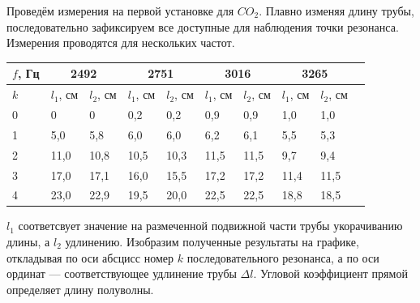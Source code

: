 \documentclass[a4paper, 12pt]{article} %
\begin{document}
        Проведём измерения на первой установке для $CO_2$.
        Плавно изменяя длину трубы, последовательно зафиксируем все доступные для наблюдения точки резонанса. Измерения проводятся для нескольких частот.
        \begin{center}
        \begin{tabular}{|l|l|l|l|l|l|l|l|l|l|}
            \hline
            $f$, Гц & \multicolumn{2}{|c|}{2492} & \multicolumn{2}{|c|}{2751}&  \multicolumn{2}{|c|}{3016} & \multicolumn{2}{|c|}{3265}
            \\
            \hline
            $k$ &  $l_1$, см& $l_2$, см & $l_1$, см & $l_2$, см & $l_1$, см & $l_2$, см & $l_1$, см & $l_2$, см
            \\
            
            \hline
            0 & 0 & 0 & 0,2 & 0,2 & 0,9 & 0,9 & 1,0 & 1,0
            \\
            \hline
            1 & 5,0 & 5,8 & 6,0 & 6,0 & 6,2 &  6,1 & 5,5 & 5,3
            \\
            \hline
            2 & 11,0 & 10,8 & 10,5 & 10,3 & 11,5 & 11,5 & 9,7 & 9,4
            \\
            \hline
            3 & 17,0 & 17,1 & 16,0 & 15,5 & 17,2 & 17,2 & 11,4 & 11,5
            \\
            \hline
            4 & 23,0 & 22,9 & 19,5 & 20,0 & 22,5 & 22,5 & 18,8 & 18,5
            \\
            \hline
        \end{tabular}
        \end{center}
        $l_1$ соответсвует значение на размеченной подвижной части трубы укорачиванию длины, а $l_2$ удлинению.
        Изобразим полученные результаты на графике, откладывая по оси абсцисс номер $k$ последовательного резонанса, а по оси ординат — соответствующее удлинение трубы
        $\Delta l$. Угловой коэффициент прямой определяет длину полуволны.
        
\end{document}
